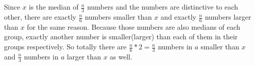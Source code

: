 \documentclass[12pt,letterpaper]{article}
\begin{document}
\newpage
\section{}
\subsection{}
Since $x$ is the median of $\frac{n}{3}$ numbers and the numbers are distinctive to each other, there are exactly $\frac{n}{6}$ numbers smaller than $x$ and exactly $\frac{n}{6}$ numbers larger than $x$ for the same reason. Because those numbers are also medians of each group, exactly another number is smaller(larger) than each of them in their groups respectively. So totally there are $\frac{n}{6}*2=\frac{n}{3}$ numbers in $a$ smaller than $x$ and $\frac{n}{3}$ numbers in $a$ larger than $x$ as well. 
\subsection{}
\end{document}
